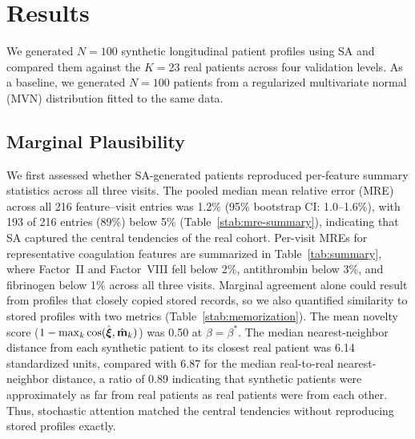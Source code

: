\section{Results}
\label{sec:results}

We generated $N{=}100$ synthetic longitudinal patient profiles using SA and compared
them against the $K{=}23$ real patients across four validation levels. As a baseline, we generated
$N{=}100$ patients from a regularized multivariate normal (MVN) distribution fitted
to the same data.

\subsection{Marginal Plausibility}
\label{sec:results-l1}

We first assessed whether SA-generated patients reproduced per-feature summary
statistics across all three visits. The pooled median mean relative error
(MRE) across all 216 feature--visit entries was 1.2\% (95\% bootstrap CI:
1.0--1.6\%), with 193 of 216 entries (89\%) below 5\%
(Table~\ref{stab:mre-summary}), indicating that SA captured the central
tendencies of the real cohort. Per-visit MREs for representative
coagulation features are summarized in Table~\ref{tab:summary}, where
Factor~II and Factor~VIII fell below 2\%, antithrombin below 3\%, and
fibrinogen below 1\% across all three visits. Marginal agreement alone could result from
profiles that closely copied stored records, so we also quantified similarity to stored
profiles with two metrics (Table~\ref{stab:memorization}). The mean novelty score
($1 - \max_k \cos(\hat{\boldsymbol{\xi}}, \hat{\mathbf{m}}_k)$) was 0.50 at
$\beta = \beta^*$. The median
nearest-neighbor distance from each synthetic patient to its closest real
patient was 6.14 standardized units, compared with 6.87 for the median
real-to-real nearest-neighbor distance, a ratio of 0.89 indicating that
synthetic patients were approximately as far from real patients as real
patients were from each other. Thus, stochastic attention matched the central tendencies
without reproducing stored profiles exactly.

